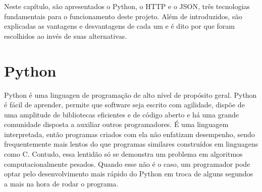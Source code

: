 \documentclass[12pt,a4paper]{ufpr}
\begin{document}
Neste capítulo, são apresentados o Python, o HTTP e o JSON, três tecnologias fundamentais para o funcionamento deste projeto. Além de introduzidos, são explicadas as vantagens e desvantagens de cada um e é dito por que foram escolhidos ao invés de suas alternativas.

\section{Python}

Python \cite{python} é uma linguagen de programação de alto nível de propósito geral. 
Python é fácil de aprender, permite que software seja escrito com agilidade, dispõe de uma amplitude de bibliotecas eficientes e de código aberto e há uma grande comunidade disposta a auxiliar outros programadores.
É uma linguagem interpretada, então programas criados com ela não enfatizam desempenho, sendo frequentemente mais lentos do que programas similares construídos em linguagens como C.
Contudo, essa lentidão só se demonstra um problema em algoritmos computacionalmente pesados.
Quando esse não é o caso, um programador pode optar pelo desenvolvimento mais rápido do Python em troca de alguns segundos a mais na hora de rodar o programa.
\end{document}
